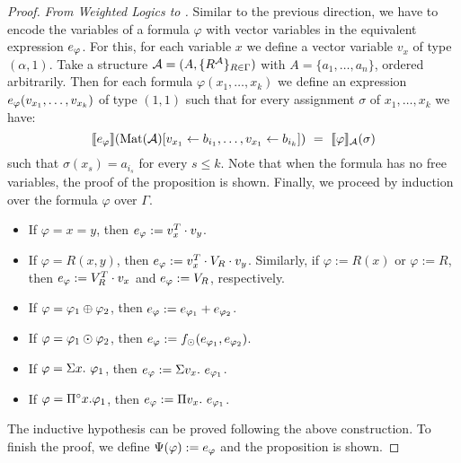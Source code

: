 \begin{proof}
\noindent \emph{From Weighted Logics to \langprod.} 
Similar to the previous direction, we have to encode the \langprod variables of a formula $\varphi$ with vector variables in the equivalent \langprod expression $e_\varphi$. For this, for each \langprod variable $x$ we define a vector variable $v_x$ of type $(\alpha, 1)$. 
Take a structure $\mathcal{A} = (A, \{R^{\mathcal{A}}\}_{R \in \Gamma})$ with $A = \{a_1, \ldots, a_n\}$, ordered arbitrarily.
Then for each formula $\varphi(x_1, \ldots, x_k)$ we define an expression $e_\varphi(v_{x_1}, \ldots, v_{x_k})$ of type $(1,1)$ such that for every assignment $\sigma$ of $x_1, \ldots, x_k$ we have:
$$
\sem{\evarphi}{\text{Mat}(\cA)[v_{x_1} \gets b_{i_1},\ldots,v_{x_1}\gets b_{i_k}]} \ = \ \ssem{\varphi}{\cA}(\sigma) 
$$
such that $\sigma(x_{s}) = a_{i_s}$ for every $s \leq k$. Note that when the formula has no free variables, the proof of the proposition is shown. Finally, we proceed by induction over the formula $\varphi$ over $\Gamma$.
\begin{itemize} \itemsep3mm
  \item If $\varphi=x=y$, then $e_\varphi:= v_x^T \cdot v_{y}$.
  \item If $\varphi=R(x,y)$, then $e_\varphi:=v_x^T \cdot V_R \cdot v_{y}$. Similarly, if $\varphi:=R(x)$ or $\varphi:=R$, then $e_\varphi:= V_R^T \cdot v_{x}$  and $e_\varphi:= V_R$, respectively. 
  \item If $\varphi = \varphi_1 \oplus \varphi_2$, then $e_\varphi:= e_{\varphi_1} + e_{\varphi_2}$.
  \item If $\varphi = \varphi_1 \odot \varphi_2$, then $e_\varphi:= f_\odot(e_{\varphi_1},e_{\varphi_2})$.
  \item If $\varphi = \Sigma x.\  \varphi_1$, then $e_\varphi :=\Sigma v_x.\ e_{\varphi_1}$.
  \item If $\varphi = \Pi^{\circ} x. \varphi_1$, then $e_\varphi := \Pi v_x.\ e_{\varphi_1}$.
\end{itemize}
The inductive hypothesis can be proved following the above construction. To finish the proof, we define $\Psi(\varphi) := e_\varphi$ and the proposition is shown.
\end{proof}
